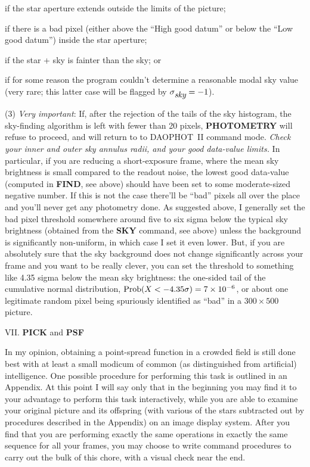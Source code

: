  if the star aperture extends outside the limits of the picture; 

 if there is a bad pixel (either above the ``High good
datum'' or below the ``Low good datum'') inside the star aperture;

 if the star + sky is fainter than the sky; or 

 if for some reason the program couldn't determine a
reasonable modal sky value (very rare; this latter case will be flagged
by $\sigma_{\hbox{\it sky}} = -1$).

\item{(3)} {\it Very important\/}:  If, after the rejection of the
tails of the sky histogram, the sky-finding algorithm is left with
fewer than 20 pixels, {\bf PHOTOMETRY} will refuse to proceed, and will
return to to DAOPHOT~II command mode.  {\it Check your inner and outer
sky annulus radii, and your good data-value limits.\/}  In particular,
if you are reducing a short-exposure frame, where the mean sky
brightness is small compared to the readout noise, the lowest good
data-value (computed in {\bf FIND}, see above) should have been set to
some moderate-sized negative number.  If this is not the case there'll
be ``bad'' pixels all over the place and you'll never get any
photometry done.  As suggested above, I generally set the bad pixel
threshold somewhere around five to six sigma below the typical sky
brightness (obtained from the {\bf SKY} command, see above) unless the
background is significantly non-uniform, in which case I set it even
lower.  But, if you are absolutely sure that the sky background does
not change significantly across your frame and you want to be really
clever, you can set the threshold to something like 4.35 sigma below
the mean sky brightness:  the one-sided tail of the cumulative normal
distribution, $\hbox{\rm Prob}(X < -4.35 \sigma) = 7\times 10^{-6}$, or
about one legitimate random pixel being spuriously identified as
``bad'' in a $300 \times 500$ picture.  

\vfill 
\eject 
\noindent VII.  {\bf PICK} and {\bf PSF}

In my opinion, obtaining a point-spread function in a crowded field is
still done best with at least a small modicum of common (as
distinguished from artificial) intelligence. One possible procedure for
performing this task is outlined in an Appendix. At this point I will
say only that in the beginning you may find it to your advantage to
perform this task interactively, while you are able to examine your
original picture and its offspring (with various of the stars
subtracted out by procedures described in the Appendix) on an image
display system.  After you find that you are performing exactly the
same operations in exactly the same sequence for all your frames, you
may choose to write command procedures to carry out the bulk of this
chore, with a visual check near the end.

